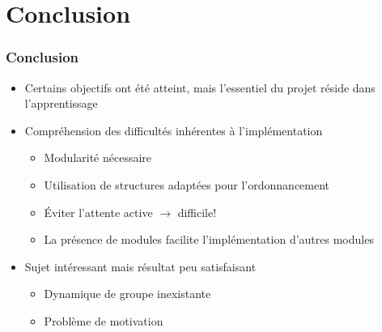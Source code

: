 \documentclass{beamer}
\begin{document}
\section{Conclusion}

\begin{frame}
  \frametitle{Conclusion}
  \begin{itemize}
  \item Certains objectifs ont été atteint, mais l'essentiel du projet réside
    dans l'apprentissage
  \item Compréhension des difficultés inhérentes à l'implémentation
    \begin{itemize}
    \item Modularité nécessaire
    \item Utilisation de structures adaptées pour l'ordonnancement
    \item Éviter l'attente active $\rightarrow$ difficile!
    \item La présence de modules facilite l'implémentation d'autres modules 
    \end{itemize}
  \item Sujet intéressant mais résultat peu satisfaisant
    \begin{itemize}
    \item Dynamique de groupe inexistante
    \item Problème de motivation
    \end{itemize}
  \end{itemize}
\end{frame}


 
\end{document}
